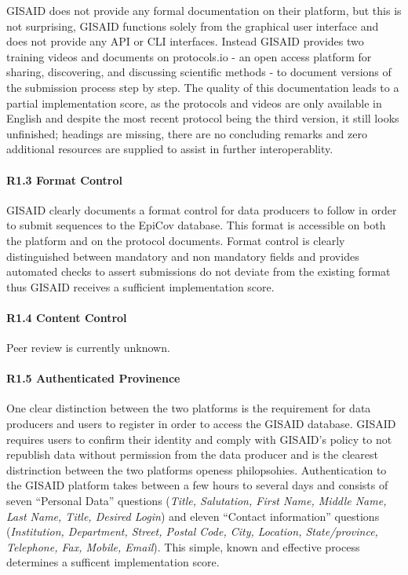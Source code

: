 \documentclass{article}
\begin{document}
GISAID does not provide any formal documentation on their platform, but
this is not surprising, GISAID functions solely from the graphical user
interface and does not provide any API or CLI interfaces. Instead GISAID
provides two training videos and documents on protocols.io - an open
access platform for sharing, discovering, and discussing scientific
methods - to document versions of the submission process step by step.
The quality of this documentation leads to a partial implementation
score, as the protocols and videos are only available in English and
despite the most recent protocol being the third version, it still looks
unfinished; headings are missing, there are no concluding remarks and
zero additional resources are supplied to assist in further
interoperablity.

\hypertarget{r1.3-format-control}{%
\paragraph{R1.3 Format Control}\label{r1.3-format-control}}

GISAID clearly documents a format control for data producers to follow
in order to submit sequences to the EpiCov database. This format is
accessible on both the platform and on the protocol documents. Format
control is clearly distinguished between mandatory and non mandatory
fields and provides automated checks to assert submissions do not
deviate from the existing format thus GISAID receives a sufficient
implementation score.

\hypertarget{r1.4-content-control}{%
\paragraph{R1.4 Content Control}\label{r1.4-content-control}}

Peer review is currently unknown.

\hypertarget{r1.5-authenticated-provinence}{%
\paragraph{R1.5 Authenticated
Provinence}\label{r1.5-authenticated-provinence}}

One clear distinction between the two platforms is the requirement for
data producers and users to register in order to access the GISAID
database. GISAID requires users to confirm their identity and comply
with GISAID's policy to not republish data without permission from the
data producer and is the clearest distrinction between the two platforms
openess philopsohies. Authentication to the GISAID platform takes
between a few hours to several days and consists of seven ``Personal
Data'' questions (\emph{Title, Salutation, First Name, Middle Name, Last
Name, Title, Desired Login}) and eleven ``Contact information''
questions (\emph{Institution, Department, Street, Postal Code, City,
Location, State/province, Telephone, Fax, Mobile, Email}). This simple,
known and effective process determines a sufficent implementation score.
\end{document}

